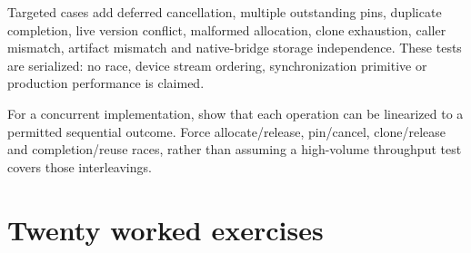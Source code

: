 Targeted cases add deferred cancellation, multiple outstanding pins, duplicate
completion, live version conflict, malformed allocation, clone exhaustion,
caller mismatch, artifact mismatch and native-bridge storage independence.
These tests are serialized: no race, device stream ordering, synchronization
primitive or production performance is claimed.

For a concurrent implementation, show that each operation can be linearized
to a permitted sequential outcome. Force allocate/release, pin/cancel,
clone/release and completion/reuse races, rather than assuming a high-volume
throughput test covers those interleavings.

\section{Twenty worked exercises}
